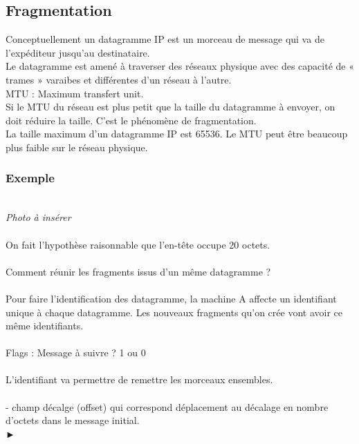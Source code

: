 \documentclass{article}
\begin{document}
\subsection{Fragmentation}
Conceptuellement un datagramme IP est un morceau de message qui va de l’expéditeur jusqu’au destinataire. \\
Le datagramme est amené à traverser des réseaux physique avec des capacité de « trames » varaibes et différentes d’un réseau à l’autre. \\
MTU : Maximum transfert unit. \\  
Si le MTU du réseau est plus petit que la taille du datagramme à envoyer, on doit réduire la taille. C’est le phénomène de fragmentation. \\
La taille maximum d’un datagramme IP est 65536. Le MTU peut être beaucoup plus faible sur le réseau physique. \\
\subsubsection*{Exemple} \\
\emph{Photo à insérer} \\ 
\\
On fait l'hypothèse raisonnable que l'en-tête occupe 20 octets. \\ 
\\
Comment réunir les fragments issus d'un même datagramme ? \\
\\
Pour faire l’identification des datagramme, la machine A affecte un identifiant unique à chaque datagramme. 
Les nouveaux fragments  qu’on crée vont avoir ce même identifiants. \\
\\
Flags : Message à suivre ? 1 ou 0 \\
\\
\newpage
L'identifiant va permettre de remettre les morceaux ensembles. \\
\\ 
- champ décalge (offset) qui correspond déplacement au décalage en nombre d'octets dans le message initial.\\►
\end{document}
